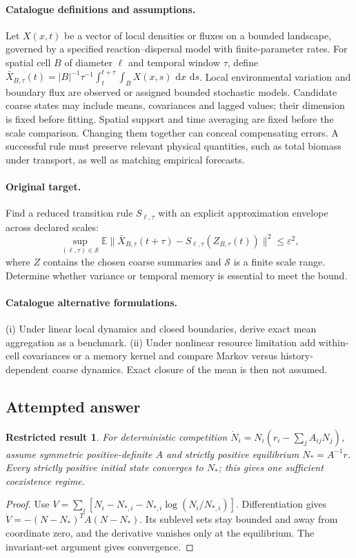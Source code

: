 \documentclass[11pt]{article}
\newcommand{\E}{\mathbb E}
\newcommand{\dd}{\,\mathrm d}
\providecommand{\E}{\mathbb E}
\newtheorem{attemptresult}{Restricted result}[section]
\begin{document}
\paragraph{Catalogue definitions and assumptions.}
Let $X(x,t)$ be a vector of local densities or fluxes on a bounded landscape, governed by a specified reaction--dispersal model with finite-parameter rates. For spatial cell $B$ of diameter $\ell$ and temporal window $\tau$, define $\bar X_{B,\tau}(t)=|B|^{-1}\tau^{-1}\int_t^{t+\tau}\int_BX(x,s)\,\dd x\,\dd s$. Local environmental variation and boundary flux are observed or assigned bounded stochastic models. Candidate coarse states may include means, covariances and lagged values; their dimension is fixed before fitting. Spatial support and time averaging are fixed before the scale comparison. Changing them together can conceal compensating errors. A successful rule must preserve relevant physical quantities, such as total biomass under transport, as well as matching empirical forecasts.
\paragraph{Original target.}
Find a reduced transition rule $S_{\ell,\tau}$ with an explicit approximation envelope across declared scales:
\[
 \sup_{(\ell,\tau)\in\mathcal S}
 \E\|\bar X_{B,\tau}(t+\tau)
       -S_{\ell,\tau}(Z_{B,\tau}(t))\|^2\le\varepsilon^2,
\]
where $Z$ contains the chosen coarse summaries and $\mathcal S$ is a finite scale range. Determine whether variance or temporal memory is essential to meet the bound.
\paragraph{Catalogue alternative formulations.}
(i) Under linear local dynamics and closed boundaries, derive exact mean aggregation as a benchmark. (ii) Under nonlinear resource limitation add within-cell covariances or a memory kernel and compare Markov versus history-dependent coarse dynamics. Exact closure of the mean is then not assumed.
\subsection{Attempted answer}
\begin{attemptresult}
For deterministic competition $\dot N_i=N_i(r_i-\sum_jA_{ij}N_j)$, assume symmetric positive-definite $A$ and strictly positive equilibrium $N_*=A^{-1}r$. Every strictly positive initial state converges to $N_*$; this gives one sufficient coexistence regime.
\end{attemptresult}
\begin{proof}
Use $V=\sum_i[N_i-N_{*,i}-N_{*,i}\log(N_i/N_{*,i})]$. Differentiation gives $\dot V=-(N-N_*)^TA(N-N_*)$. Its sublevel sets stay bounded and away from coordinate zero, and the derivative vanishes only at the equilibrium. The invariant-set argument gives convergence.
\end{proof}
\end{document}
